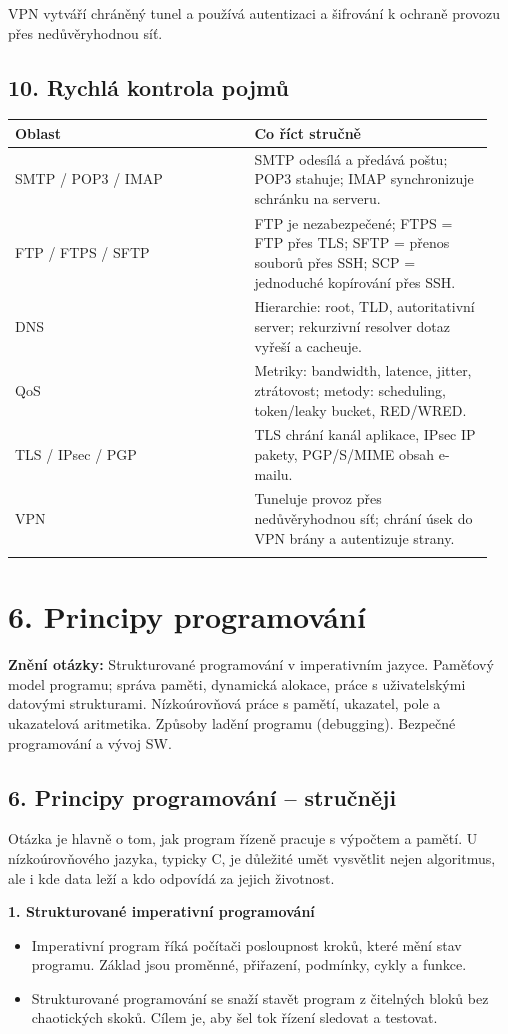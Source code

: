 \documentclass[11pt,a4paper]{article}
\newcommand{\otazka}[3]{\section*{#1}\addcontentsline{toc}{section}{#1}\noindent\textbf{Znění otázky:} #2\par\medskip}
\begin{document}
VPN vytváří chráněný tunel a používá autentizaci a šifrování k ochraně provozu přes nedůvěryhodnou síť.

\subsection*{10. Rychlá kontrola pojmů}

\begin{longtable}{p{0.475\linewidth}p{0.475\linewidth}}
\toprule
\textbf{Oblast} & \textbf{Co říct stručně} \\
\midrule\endhead
SMTP / POP3 / IMAP & SMTP odesílá a předává poštu; POP3 stahuje; IMAP synchronizuje schránku na serveru. \\
\addlinespace
FTP / FTPS / SFTP & FTP je nezabezpečené; FTPS = FTP přes TLS; SFTP = přenos souborů přes SSH; SCP = jednoduché kopírování přes SSH. \\
\addlinespace
DNS & Hierarchie: root, TLD, autoritativní server; rekurzivní resolver dotaz vyřeší a cacheuje. \\
\addlinespace
QoS & Metriky: bandwidth, latence, jitter, ztrátovost; metody: scheduling, token/leaky bucket, RED/WRED. \\
\addlinespace
TLS / IPsec / PGP & TLS chrání kanál aplikace, IPsec IP pakety, PGP/S/MIME obsah e-mailu. \\
\addlinespace
VPN & Tuneluje provoz přes nedůvěryhodnou síť; chrání úsek do VPN brány a autentizuje strany. \\
\addlinespace
\bottomrule
\end{longtable}

\newpage

\otazka{6. Principy programování}{Strukturované programování v imperativním jazyce. Paměťový model programu; správa paměti, dynamická alokace, práce s uživatelskými datovými strukturami. Nízkoúrovňová práce s pamětí, ukazatel, pole a ukazatelová aritmetika. Způsoby ladění programu (debugging). Bezpečné programování a vývoj SW.}{PB071, PV080}

\subsection*{6. Principy programování -- stručněji}
Otázka je hlavně o tom, jak program řízeně pracuje s výpočtem a pamětí. U nízkoúrovňového jazyka, typicky C, je důležité umět vysvětlit nejen algoritmus, ale i kde data leží a kdo odpovídá za jejich životnost.

\textbf{1. Strukturované imperativní programování}
\begin{itemize}
  \item Imperativní program říká počítači posloupnost kroků, které mění stav programu. Základ jsou proměnné, přiřazení, podmínky, cykly a funkce.
  \item Strukturované programování se snaží stavět program z čitelných bloků bez chaotických skoků. Cílem je, aby šel tok řízení sledovat a testovat.
\end{itemize}
\end{document}
